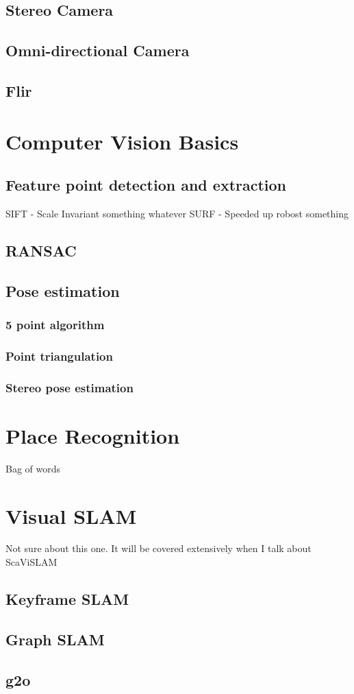 \subsection{Stereo Camera}

\subsection{Omni-directional Camera}

\subsection{Flir}

\section{Computer Vision Basics}

\subsection{Feature point detection and extraction}

SIFT - Scale Invariant something whatever
SURF - Speeded up robost something

\subsection{RANSAC}

\subsection{Pose estimation}

\subsubsection{5 point algorithm}

\subsubsection{Point triangulation}

\subsubsection{Stereo pose estimation}

\section{Place Recognition}

Bag of words

\section{Visual SLAM}
Not sure about this one.  It will be covered extensively when I talk about ScaViSLAM

\subsection{Keyframe SLAM}

\subsection{Graph SLAM}

\subsection{g2o}
